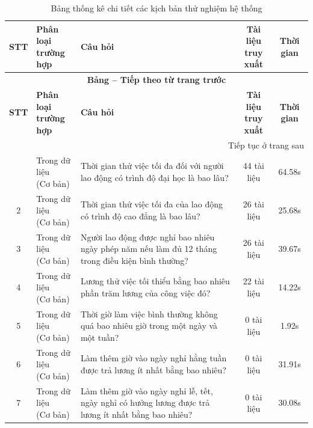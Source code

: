 \begin{longtable}{|c|l|p{6.5cm}|c|c|}
\caption{Bảng thống kê chi tiết các kịch bản thử nghiệm hệ thống} \label{tab:thong_ke_chi_tiet} \\
\hline
\textbf{STT} & \makecell[l]{\textbf{Phân loại}\\\textbf{trường hợp}} & \textbf{Câu hỏi} & \makecell{\textbf{Tài liệu}\\\textbf{truy xuất}} & \textbf{Thời gian} \\ \hline
\endfirsthead
\multicolumn{5}{c}{{\bfseries Bảng \thetable{} -- Tiếp theo từ trang trước}} \\
\hline
\textbf{STT} & \makecell[l]{\textbf{Phân loại}\\\textbf{trường hợp}} & \textbf{Câu hỏi} & \makecell{\textbf{Tài liệu}\\\textbf{truy xuất}} & \textbf{Thời gian} \\ \hline
\endhead
\hline
\multicolumn{5}{r}{{Tiếp tục ở trang sau}} \\
\endfoot
\hline
\endlastfoot
1 & \makecell[l]{Trong dữ liệu\\(Cơ bản)} & Thời gian thử việc tối đa đối với người lao động có trình độ đại học là bao lâu? & 44 tài liệu & 64.58s \\ \hline
2 & \makecell[l]{Trong dữ liệu\\(Cơ bản)} & Thời gian thử việc tối đa của lao động có trình độ cao đẳng là bao lâu? & 26 tài liệu & 25.68s \\ \hline
3 & \makecell[l]{Trong dữ liệu\\(Cơ bản)} & Người lao động được nghỉ bao nhiêu ngày phép năm nếu làm đủ 12 tháng trong điều kiện bình thường? & 26 tài liệu & 39.67s \\ \hline
4 & \makecell[l]{Trong dữ liệu\\(Cơ bản)} & Lương thử việc tối thiểu bằng bao nhiêu phần trăm lương của công việc đó? & 22 tài liệu & 14.22s \\ \hline
5 & \makecell[l]{Trong dữ liệu\\(Cơ bản)} & Thời giờ làm việc bình thường không quá bao nhiêu giờ trong một ngày và một tuần? & 0 tài liệu & 1.92s \\ \hline
6 & \makecell[l]{Trong dữ liệu\\(Cơ bản)} & Làm thêm giờ vào ngày nghỉ hằng tuần được trả lương ít nhất bằng bao nhiêu? & 0 tài liệu & 31.91s \\ \hline
7 & \makecell[l]{Trong dữ liệu\\(Cơ bản)} & Làm thêm giờ vào ngày nghỉ lễ, tết, ngày nghỉ có hưởng lương được trả lương ít nhất bằng bao nhiêu? & 0 tài liệu & 30.08s \\ \hline

\end{longtable}
